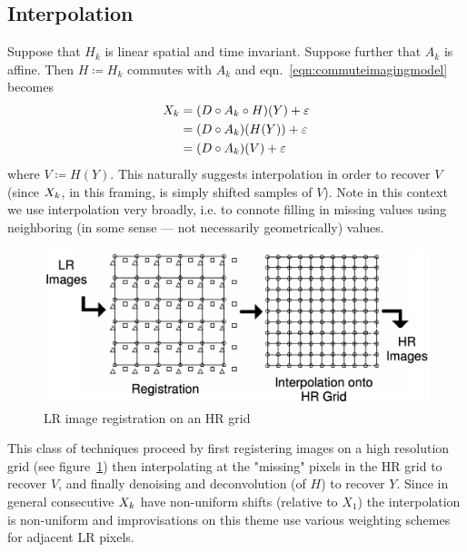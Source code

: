 \subsection{Interpolation}\label{subsec:interpolation}

Suppose that $H_k$ is linear spatial and time invariant.
%
Suppose further that $A_k$ is affine.
%
Then $H \coloneqq H_k$ commutes with $A_k$\cite{meladcommute} and eqn.~\eqref{eqn:commuteimagingmodel} becomes
\begin{equation}
	\label{eqn:commuteimagingmodel}
	\begin{split}
		\Xk &= (D \circ A_k \circ H) (Y) + \varepsilon \\
		&= (D \circ A_k) (H(Y)) + \varepsilon \\
		&= (D \circ A_k) (V) + \varepsilon
	\end{split}
\end{equation}
%
where $V \coloneqq H(Y)$.
%
This naturally suggests interpolation in order to recover $V$ (since $X_k$, in this framing, is simply shifted samples of $V$).
%
Note in this context we use interpolation very broadly, i.e. to connote filling in missing values using neighboring (in some sense --- not necessarily geometrically) values.
%
\begin{figure}
	\centering
	\includegraphics[width=\linewidth,keepaspectratio]{figures/classical/hrgrid.png}
	\caption{LR image registration on an HR grid\cite{Lin}}
	\label{fig:hrgrid}
\end{figure}
This class of techniques proceed by first registering images on a high resolution grid (see figure~\ref{fig:hrgrid}) then interpolating at the "missing" pixels in the HR grid to recover $V$, and finally denoising and deconvolution (of $H$) to recover $Y$.
%
Since in general consecutive $X_k$ have non-uniform shifts (relative to $X_1$) the interpolation is non-uniform and improvisations on this theme use various weighting schemes for adjacent LR pixels.

